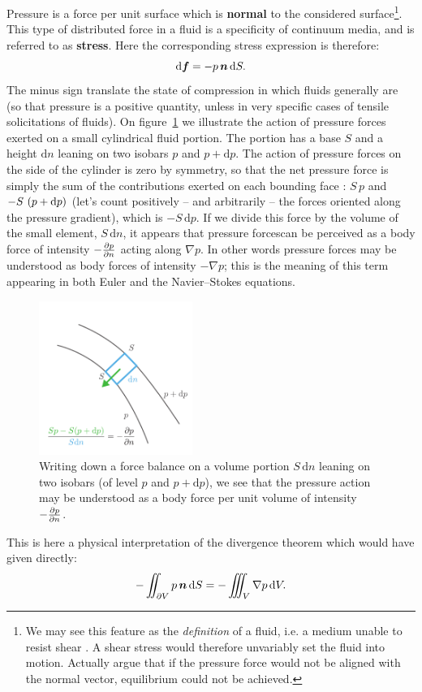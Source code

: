 \noindent Pressure is a force per unit surface which is \textbf{normal} to the considered surface\footnote{We may see this feature as the \textit{definition} of a fluid, i.e. a medium unable to resist shear \citep{Prandtl1957}. A shear stress would therefore unvariably set the fluid into motion. Actually \citet[][\S1.3]{Batchelor1967} argue that if the pressure force would not be aligned with the normal vector, equilibrium could not be achieved.}. This type of distributed force in a fluid is a specificity of continuum media, and is referred to as \textbf{stress}. Here the corresponding stress expression is therefore:
\begin{equation}
\mathrm d \bff = -p \,\bn \,\dS.
\label{eq:pressure_stress}
\end{equation}
The minus sign translate the state of compression in which fluids generally are (so that pressure is a positive quantity, unless in very specific cases of tensile solicitations of fluids).
 On figure~\ref{fig:pressure_gradient} we illustrate the action of pressure forces exerted on a small cylindrical fluid portion. The portion has a base $S$ and a height $\mathrm dn$ leaning on two isobars $p$ and $p+\mathrm dp$. The action of pressure forces on the side of the cylinder is zero by symmetry, so that the net pressure force is simply the sum of the contributions exerted on each bounding face : $S\,p$ and $-S\,\left( p+\mathrm dp\right)$ (let's count positively -- and arbitrarily -- the forces oriented along the pressure gradient), which is $-S \,\mathrm dp$. If we divide this force by the volume of the small element, $S \, \mathrm dn$, it appears that pressure forcescan be perceived as a body force of intensity $-\frac{\partial p}{\partial n}$ acting along $\nabla p$. In other words pressure forces may be understood as body forces of intensity $-\nabla p$; this is the meaning of this term appearing in both Euler and the Navier--Stokes equations.
\begin{figure}[htbp]
\begin{center}
\includegraphics[page=1,width=5cm]{./pics/pressure_gradient.pdf}
\caption{Writing down a force balance on a volume portion $S\,\mathrm dn$ leaning on two isobars (of level $p$ and $p + \mathrm dp$), we see that the pressure action may be understood as a body force per unit volume of intensity~$-\frac{\partial p}{\partial n}$.}
\label{fig:pressure_gradient}
\end{center}
\end{figure}
This is here a physical interpretation of the divergence theorem which would have given directly:
$$
-\iint_{\partial V} p \,\bn \, \dS = -\iiint_V \nabla p \,\dV.
$$

